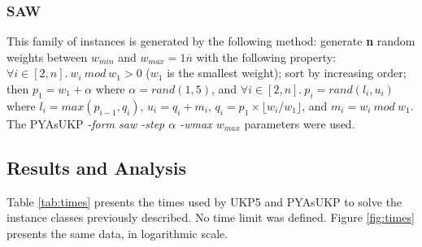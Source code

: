 \documentclass[runningheads,a4paper]{llncs}
\begin{document}
\subsubsection{SAW}
This family of instances is generated by the following method: generate \textbf{n} random weights between \(w_{min}\) and \(w_{max} = 1\overline{n}\) with the following property: \(\forall i \in [2, n].~w_i~mod~w_1 > 0\) (\(w_1\) is the smallest weight); sort by increasing order; then \(p_1 = w_1 + \alpha\) where \(\alpha = rand(1,5)\), and \(\forall i \in [2, n].~p_i = rand(l_i, u_i)\) where \(l_i = max(p_{i-1}, q_i)\), \(u_i = q_i + m_i\), \(q_i = p_1 \times \lfloor w_i / w_1 \rfloor \), and \(m_i = w_i~mod~w_1\). The PYAsUKP \emph{-form saw -step \(\alpha\) -wmax \(w_{max}\)} parameters were used.

\subsection{Results and Analysis}

Table \ref{tab:times} presents the times used by UKP5 and PYAsUKP to solve the instance classes previously described. No time limit was defined. Figure \ref{fig:times} presents the same data, in logarithmic scale.
\end{document}
